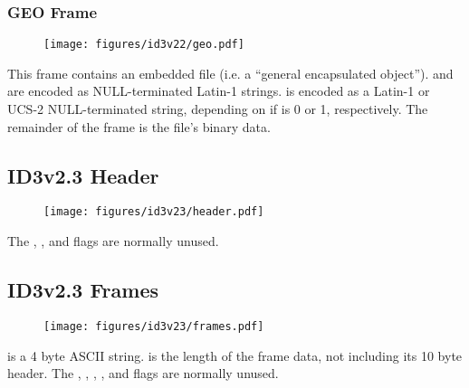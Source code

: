 \clearpage

\subsubsection{GEO Frame}
\begin{figure}[h]
  \texttt{[image: figures/id3v22/geo.pdf]}
\end{figure}
\par
\noindent
This frame contains an embedded file (i.e. a ``general encapsulated object'').
 and  are encoded as NULL-terminated
Latin-1 strings.
 is encoded as a Latin-1 or UCS-2 NULL-terminated
string, depending on if  is 0 or 1, respectively.
The remainder of the frame is the file's binary data.

\clearpage

\subsection{ID3v2.3 Header}
\begin{figure}[h]
\texttt{[image: figures/id3v23/header.pdf]}
\end{figure}
\par
\noindent
The , ,  and 
flags are normally unused.

\subsection{ID3v2.3 Frames}
\begin{figure}[h]
  \texttt{[image: figures/id3v23/frames.pdf]}
\end{figure}
\par
\noindent
{} is a 4 byte ASCII string.
 is the length of the frame data,
not including its 10 byte header.
The , , ,
,  and  flags
are normally unused.

\clearpage


